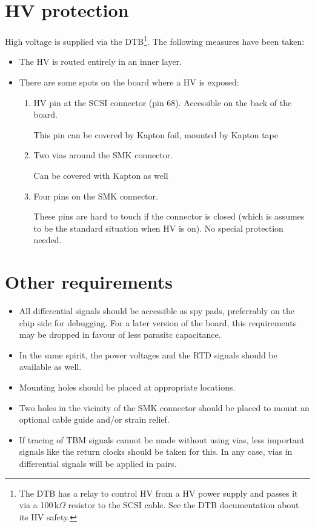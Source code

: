 \section{HV protection}
High voltage is supplied via the DTB\footnote{The DTB has a relay to control HV from a HV power supply and passes it via a 100\,k$\Omega$ resistor to the SCSI cable. See the DTB documentation about its HV safety.}. The following measures have been taken:
\begin{itemize}
    \item The HV is routed entirely in an inner layer.
    \item There are some spots on the board where a HV is exposed:
    \begin{enumerate}
	\item HV pin at the SCSI connector (pin 68). Accessible on the back of the board.
    
	This pin can be covered by Kapton foil, mounted by Kapton tape
	\item Two vias around the SMK connector.
    
	Can be covered with Kapton as well
	\item Four pins on the SMK connector.
    
	These pins are hard to touch if the connector is closed (which is assumes to be the standard situation when HV is on). No special protection needed.
    \end{enumerate}
\end{itemize}

\section{Other requirements}
\begin{itemize}
    \item All differential signals should be accessible as spy pads, preferrably on the chip side for debugging. For a later version of the board, this requirements may be dropped in favour of less parasitc capacitance.
    \item In the same spirit, the power voltages and the RTD signals should be available as well.
    \item Mounting holes should be placed at appropriate locations.
    \item Two holes in the vicinity of the SMK connector should be placed to mount an optional cable guide and/or strain relief.
    \item If tracing of TBM signals cannot be made without using vias, less important signals like the return clocks should be taken for this. In any case, vias in differential signals will be applied in pairs.
\end{itemize}


